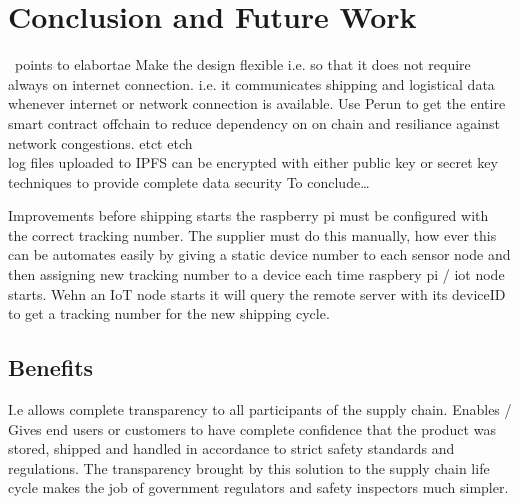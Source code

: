 \section{Conclusion and Future Work}
\ points to elabortae
Make the design flexible i.e. so that it does not require always on internet connection.
i.e. it communicates shipping and logistical data whenever internet or network connection is available.
Use Perun to get the entire smart contract offchain to reduce dependency on on chain and resiliance against network congestions.
etct etch
\\ log files uploaded to IPFS can be encrypted with either public key or secret key techniques to provide complete data security 
To conclude\ldots

Improvements 
before shipping starts the raspberry pi must be configured with the correct tracking number. The supplier must do this manually, how ever this can be automates easily by giving a static device number to each sensor node and then assigning new tracking number to a device each time raspbery pi / iot node starts. Wehn an IoT node starts it will query the remote server with its deviceID to get a tracking number for the new shipping cycle. 

\subsection{Benefits}
I.e allows complete transparency to all participants of the supply chain. Enables / Gives end users or customers to have complete confidence that the product was stored, shipped and handled in accordance to strict safety standards and regulations. The transparency brought by this solution to  the supply chain life cycle makes the job of government regulators and safety inspectors much simpler.